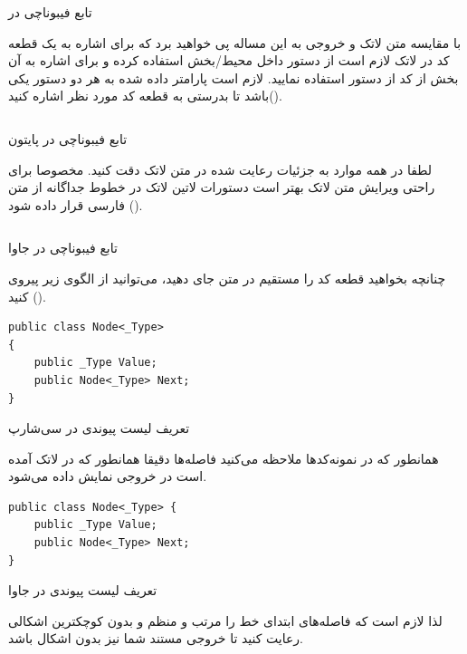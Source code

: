 \begin{program}[H]
\inputminted[frame=none]{cpp}{Sample.cpp}
\caption{تابع فیبوناچی در  }
\label{cppfib}
\end{program}

با مقایسه متن لاتک و خروجی به این مساله پی‌ خواهید برد که برای اشاره به یک قطعه کد در لاتک لازم است از دستور
داخل محیط/بخش 
استفاده کرده و برای اشاره به آن بخش از کد از دستور
استفاده نمایید. لازم است پارامتر داده شده به هر دو دستور یکی باشد تا بدرستی به قطعه کد مورد نظر اشاره کنید(). 

\begin{program}[H]
\inputminted[frame=none]{python}{sample.py}
\caption{تابع فیبوناچی در پایتون }
\label{pythonfib}
\end{program}

لطفا در همه موارد به جزئیات رعایت شده در متن لاتک دقت کنید. مخصوصا برای راحتی ویرایش متن لاتک بهتر است دستورات لاتین لاتک در خطوط جداگانه از متن فارسی قرار داده شود ().

\begin{program}[H]
\inputminted[frame=none]{java}{Sample.java}
\caption{تابع فیبوناچی در جاوا }
\label{javafib}
\end{program}
 چنانچه بخواهید قطعه کد را مستقیم در متن جای دهید، می‌توانید از الگوی زیر پیروی کنید ().
 
\begin{program}[H]
\begin{verbatim}
public class Node<_Type>
{
    public _Type Value;
    public Node<_Type> Next;
}
\end{verbatim}
\caption{تعریف لیست پیوندی در سی‌شارپ}
\label{csharpnode}
\end{program}
 
همانطور که در نمونه‌کدها ملاحظه می‌کنید فاصله‌ها دقیقا همانطور که در لاتک آمده است در خروجی نمایش داده می‌شود.
 
\begin{program}[H]
\begin{verbatim}
public class Node<_Type> {
    public _Type Value;
    public Node<_Type> Next;
}
\end{verbatim}
\label{javanode}
\caption{تعریف لیست پیوندی در ‌جاوا}
\end{program}

لذا لازم است که فاصله‌های ابتدای خط را مرتب و منظم و بدون کوچکترین اشکالی رعایت کنید تا خروجی مستند شما نیز بدون اشکال باشد.

